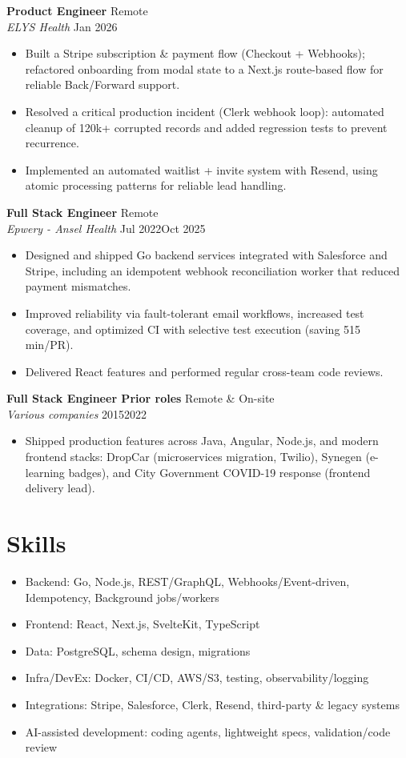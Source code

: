 \documentclass[10pt,a4paper]{article}
\newcommand{\roleentry}[4]{%
  \textbf{#1} \hfill {\small #3}\\[-0.2em]
  {\itshape #2} \hfill {\small #4}\\[-0.35em]
}
\begin{document}
\vspace{0.08em}
\roleentry{Product Engineer}{ELYS Health}{Remote}{Jan 2026}
\begin{itemize}
  \item Built a Stripe subscription \& payment flow (Checkout + Webhooks); refactored onboarding from modal state to a Next.js route-based flow for reliable Back/Forward support.
  \item Resolved a critical production incident (Clerk webhook loop): automated cleanup of 120k+ corrupted records and added regression tests to prevent recurrence.
  \item Implemented an automated waitlist + invite system with Resend, using atomic processing patterns for reliable lead handling.
\end{itemize}

\vspace{0.08em}
\roleentry{Full Stack Engineer}{Epwery - Ansel Health}{Remote}{Jul 2022\textendash{}Oct 2025}
\begin{itemize}
  \item Designed and shipped Go backend services integrated with Salesforce and Stripe, including an idempotent webhook reconciliation worker that reduced payment mismatches.
  \item Improved reliability via fault-tolerant email workflows, increased test coverage, and optimized CI with selective test execution (saving 5\textendash{}15 min/PR).
  \item Delivered React features and performed regular cross-team code reviews.
\end{itemize}

\vspace{0.08em}
\roleentry{Full Stack Engineer \textemdash{} Prior roles}{Various companies}{Remote \& On-site}{2015\textendash{}2022}
\begin{itemize}
  \item Shipped production features across Java, Angular, Node.js, and modern frontend stacks: DropCar (microservices migration, Twilio), Synegen (e-learning badges), and City Government COVID-19 response (frontend delivery lead).
\end{itemize}

\section*{Skills}
\begin{itemize}
  \item Backend: Go, Node.js, REST/GraphQL, Webhooks/Event-driven, Idempotency, Background jobs/workers
  \item Frontend: React, Next.js, SvelteKit, TypeScript
  \item Data: PostgreSQL, schema design, migrations
  \item Infra/DevEx: Docker, CI/CD, AWS/S3, testing, observability/logging
  \item Integrations: Stripe, Salesforce, Clerk, Resend, third-party \& legacy systems
  \item AI-assisted development: coding agents, lightweight specs, validation/code review
\end{itemize}
\end{document}
